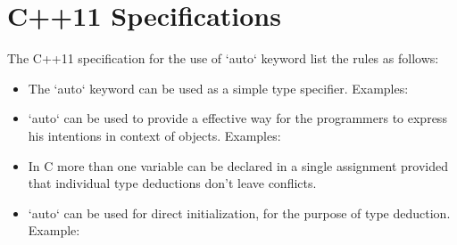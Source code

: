 \section{C++11 Specifications}
The C++11 specification for the use of `auto` keyword list the rules as follows: 
\begin{itemize}
\item The `auto` keyword can be used as a simple type specifier. Examples: 
\item `auto` can be used to provide a effective way for the programmers to express his intentions in context of objects. Examples: 
\item In C more than one variable can be declared in a single assignment provided that individual type deductions don't leave conflicts. 
\item `auto` can be used for direct initialization, for the purpose of type deduction. Example: 
\end{itemize}